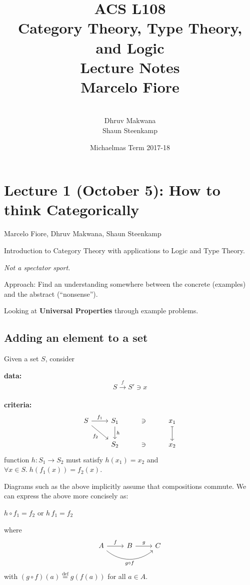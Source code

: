 \documentclass[a4paper, 12pt]{article}
\title{ACS L108\\
  Category Theory, Type Theory, and Logic\\
  Lecture Notes\\[4mm]
  \Large Marcelo Fiore}
\author{\mbox{}\\[-8mm]Dhruv Makwana\\ 
  Shaun Steenkamp}
\date{Michaelmas Term 2017-18}
\theoremstyle{definition}
\newcommand{\eqdef}{\stackrel{\text{def}}{=}} %
\newcommand{\comp}{\circ} %
\newcommand{\icomp}{\,} %
\begin{document}
\maketitle

\tableofcontents

\newpage
\section{Lecture 1 (October 5): How to think Categorically}
\vspace*{-5mm}\hspace*{7.75mm}
Marcelo Fiore, Dhruv Makwana, Shaun Steenkamp
\bigskip

Introduction to Category Theory with applications to Logic and Type Theory.

\emph{Not a spectator sport.}

Approach: Find an understanding somewhere between the concrete (examples) and
the abstract (``nonsense'').

Looking at \textbf{Universal Properties} through example problems.

\subsection{Adding an element to a set}

Given a set $S$, consider

\textbf{data:} $$ S \overset{f}{\rightarrow} S' \ni x $$ \\
\textbf{criteria:} $$
    \begin{tikzcd}
        S \arrow[r, "f_1"]
          \arrow[dr, swap, "f_2"]
          &
        S_1 \arrow[d, "h"] & \ni & x_1 \arrow[d, mapsto]
          \\
          {}&
        S_2 & \ni & x_2
    \end{tikzcd}
$$
\quad function $h : S_1 \rightarrow S_2$ must satisfy $h(x_1) = x_2$ and 
$\forall x \in S .\; h(f_1(x)) = f_2(x)$.

\begin{framed}
Diagrams such as the above implicitly assume that compositions commute.  We
can express the above more concisely as:
\begin{center}
$h\comp f_1 = f_2$
\quad or \quad
$h\icomp f_1 = f_2$
\end{center}
where 
$$
\begin{tikzcd}
    A \arrow[r, "f"] \arrow[rr, swap, bend right=40, "g \circ f"] & B \arrow[r, "g"] & C
\end{tikzcd}
$$
with $(g\comp f)(a)\eqdef g(f(a))$ for all $a\in A$.
\end{framed}
\end{document}
